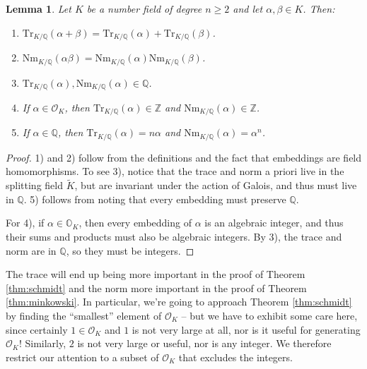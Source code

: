 \documentclass[12pt]{amsart}
\newtheorem{lemma}[theorem]{Lemma}
\theoremstyle{definition} \newtheorem*{notation}{Notation}
\theoremstyle{remark} \newtheorem*{remark}{Remark}
\theoremstyle{remark} \newtheorem*{example}{Example}
\theoremstyle{definition} \newtheorem*{definition}{Definition}
\theoremstyle{definition} \newtheorem*{question}{Question}
\numberwithin{equation}{section}
\numberwithin{theorem}{section}
\begin{document}
	\begin{lemma} \label{lem:trace-norm-props}
		Let $K$ be a number field of degree $n \geq 2$ and let $\alpha,\beta \in K$.  Then:
			\begin{enumerate}
				\item $\mathrm{Tr}_{K/\mathbb{Q}}(\alpha + \beta) = \mathrm{Tr}_{K/\mathbb{Q}}(\alpha) + \mathrm{Tr}_{K/\mathbb{Q}}(\beta)$.
				\item $\mathrm{Nm}_{K/\mathbb{Q}}(\alpha \beta) = \mathrm{Nm}_{K/\mathbb{Q}}(\alpha) \mathrm{Nm}_{K/\mathbb{Q}}(\beta)$.
				\item $\mathrm{Tr}_{K/\mathbb{Q}}(\alpha),\mathrm{Nm}_{K/\mathbb{Q}}(\alpha) \in \mathbb{Q}$.
				\item If $\alpha \in \mathcal{O}_K$, then $\mathrm{Tr}_{K/\mathbb{Q}}(\alpha) \in \mathbb{Z}$ and $\mathrm{Nm}_{K/\mathbb{Q}}(\alpha) \in \mathbb{Z}$.
				\item If $\alpha \in \mathbb{Q}$, then $\mathrm{Tr}_{K/\mathbb{Q}}(\alpha) = n\alpha$ and $\mathrm{Nm}_{K/\mathbb{Q}}(\alpha) = \alpha^n$.
			\end{enumerate}
	\end{lemma}
	\begin{proof}
	1) and 2) follow from the definitions and the fact that embeddings are field homomorphisms.  To see 3), notice that the trace and norm a priori live in the splitting field $\widetilde{K}$, but are invariant under the action of Galois, and thus must live in $\mathbb{Q}$.  5) follows from noting that every embedding must preserve $\mathbb{Q}$.
	
	For 4), if $\alpha \in \mathbb{O}_K$, then every embedding of $\alpha$ is an algebraic integer, and thus their sums and products must also be algebraic integers.  By 3), the trace and norm are in $\mathbb{Q}$, so they must be integers.
	\end{proof}
	
	The trace will end up being more important in the proof of Theorem \ref{thm:schmidt} and the norm more important in the proof of Theorem \ref{thm:minkowski}.  In particular, we're going to approach Theorem \ref{thm:schmidt} by finding the ``smallest'' element of $\mathcal{O}_K$ -- but we have to exhibit some care here, since certainly $1 \in \mathcal{O}_K$ and $1$ is not very large at all, nor is it useful for generating $\mathcal{O}_K$!  Similarly, $2$ is not very large or useful, nor is any integer.  We therefore restrict our attention to a subset of $\mathcal{O}_K$ that excludes the integers.
	
\end{document}
